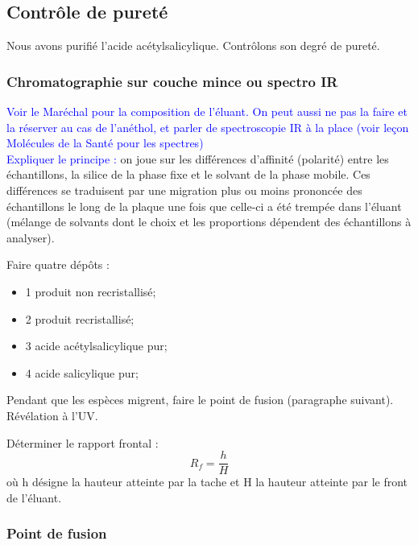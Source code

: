 \documentclass[11pt,a4paper]{report}
\begin{document}
\subsection{Contrôle de pureté}

Nous avons purifié l'acide acétylsalicylique. Contrôlons son degré de pureté.

\subsubsection*{Chromatographie sur couche mince ou spectro IR}

\textcolor{blue}{Voir le Maréchal pour la composition de l'éluant. On peut aussi ne pas la faire et la réserver au cas de l'anéthol, et parler de spectroscopie IR à la place (voir leçon Molécules de la Santé pour les spectres)}\\

\textcolor{blue}{Expliquer le principe :} on joue sur les différences d'affinité (polarité) entre les échantillons, la silice de la phase fixe et le solvant de la phase mobile. Ces différences se traduisent par une migration plus ou moins prononcée des échantillons le long de la plaque une fois que celle-ci a été trempée dans l'éluant (mélange de solvants dont le choix et les proportions dépendent des échantillons à analyser). 

Faire quatre dépôts :
\begin{itemize}
	\item 1 produit non recristallisé;
	\item 2 produit recristallisé;
	\item 3 acide acétylsalicylique pur;
	\item 4 acide salicylique pur;\\
\end{itemize}

Pendant que les espèces migrent, faire le point de fusion (paragraphe suivant).\\

Révélation à l'UV.

Déterminer le rapport frontal :
\begin{equation}
	R_f = \frac{h}{H}
\end{equation}
où h désigne la hauteur atteinte par la tache et H la hauteur atteinte par le front de l'éluant.

\subsubsection*{Point de fusion}
\end{document}
